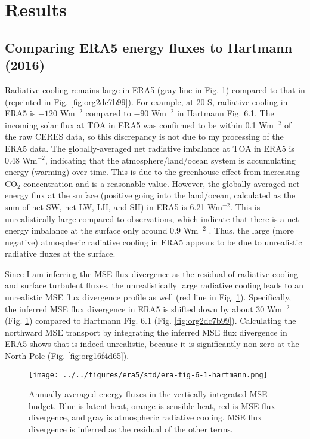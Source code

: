 \documentclass[11pt]{article}
\begin{document}
\section{Results}
\label{sec:org657b9e5}
\subsection{Comparing ERA5 energy fluxes to Hartmann (2016)}
\label{sec:orga424258}
Radiative cooling remains large in ERA5 (gray line in Fig. \ref{fig:org50048af}) compared to that in \cite{hartmann_global_2016} (reprinted in Fig. \ref{fig:org2dc7b99}). For example, at 20 S, radiative cooling in ERA5 is \(-120\) Wm\(^{-2}\) compared to \(-90\) Wm\(^{-2}\) in Hartmann Fig. 6.1. The incoming solar flux at TOA in ERA5 was confirmed to be within 0.1 Wm\(^{-2}\) of the raw CERES data, so this discrepancy is not due to my processing of the ERA5 data. The globally-averaged net radiative imbalance at TOA in ERA5 is 0.48 Wm\(^{-2}\), indicating that the atmosphere/land/ocean system is accumulating energy (warming) over time. This is due to the greenhouse effect from increasing CO\(_2\) concentration and is a reasonable value. However, the globally-averaged net energy flux at the surface (positive going into the land/ocean, calculated as the sum of net SW, net LW, LH, and SH) in ERA5 is 6.21 Wm\(^{-2}\). This is unrealistically large compared to observations, which indicate that there is a net energy imbalance at the surface only around 0.9 Wm\(^{-2}\) \cite{trenberth_earths_2009}. Thus, the large (more negative) atmospheric radiative cooling in ERA5 appears to be due to unrealistic radiative fluxes at the surface.

Since I am inferring the MSE flux divergence as the residual of radiative cooling and surface turbulent fluxes, the unrealistically large radiative cooling leads to an unrealistic MSE flux divergence profile as well (red line in Fig. \ref{fig:org50048af}). Specifically, the inferred MSE flux divergence in ERA5 is shifted down by about 30 Wm\(^{-2}\) (Fig. \ref{fig:org50048af}) compared to Hartmann Fig. 6.1 (Fig. \ref{fig:org2dc7b99}). Calculating the northward MSE transport by integrating the inferred MSE flux divergence in ERA5 shows that is indeed unrealistic, because it is significantly non-zero at the North Pole (Fig. \ref{fig:org16f4d65}).

\begin{figure}[htbp]
\centering
\texttt{[image: ../../figures/era5/std/era-fig-6-1-hartmann.png]}
\caption{\label{fig:org50048af}Annually-averaged energy fluxes in the vertically-integrated MSE budget. Blue is latent heat, orange is sensible heat, red is MSE flux divergence, and gray is atmospheric radiative cooling. MSE flux divergence is inferred as the residual of the other terms.}
\end{figure}
\end{document}
